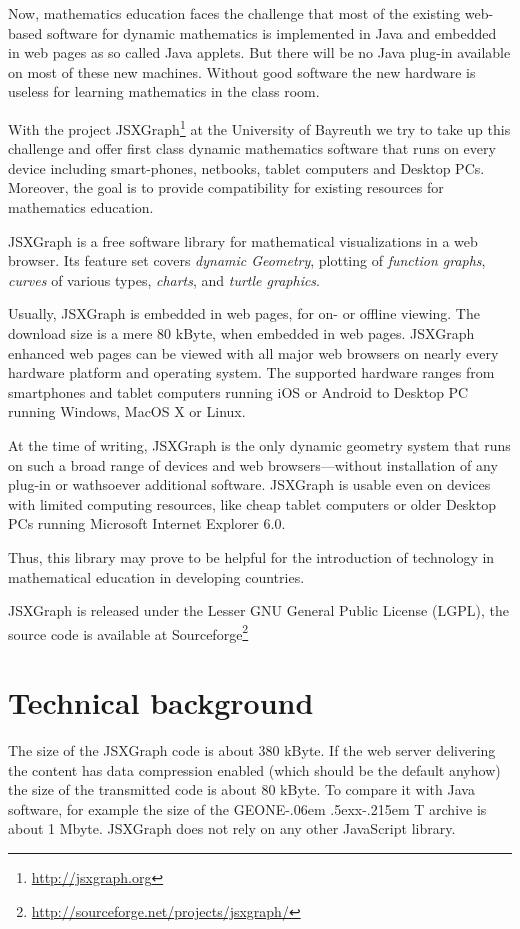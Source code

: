 \documentclass[12pt,a4paper]{article}%
\def\GEONExT{GEONE\kern-.06em \lower.5ex\hbox{x}\kern-.215em T}
\begin{document}
Now, mathematics education faces the challenge that most of the existing web-based software 
for dynamic mathematics is implemented in Java and embedded in web pages as so called Java applets.  
But there will be no Java plug-in available on most of these new machines. 
Without good software the new hardware is useless for learning mathematics 
in the class room.

With the project JSXGraph\footnote{\href{http://jsxgraph.org}{http://jsxgraph.org}} 
at the University of Bayreuth we try to take up 
this challenge and offer first class dynamic mathematics software that runs on 
every device including smart-phones, netbooks, tablet computers and Desktop PCs. 
Moreover, the goal is to provide compatibility for existing resources for 
mathematics education. 

JSXGraph is a free software library for mathematical visualizations in a web browser.
Its feature set covers {\sl dynamic Geometry}, plotting of {\sl function graphs}, 
{\sl curves} of various types, {\sl charts}, and {\sl turtle graphics}.

Usually, JSXGraph is embedded in web pages, for on- or off\/line viewing.
The download size is a mere 80 kByte, when embedded in web pages.
JSXGraph enhanced web pages can be viewed with all major web browsers 
on nearly every hardware platform and operating system.
The supported hardware ranges from smartphones and tablet computers 
running iOS or Android  to Desktop PC running Windows, MacOS X or Linux.

At the time of writing, JSXGraph is the only dynamic geometry system that runs  
on such a broad range of  devices and web browsers---without installation of any plug-in 
or wathsoever additional software.
JSXGraph is usable even on devices with limited computing resources, like cheap tablet computers or
older Desktop PCs running Microsoft Internet Explorer 6.0. 

Thus, this library may prove to be helpful for the
introduction of technology in mathematical education in developing countries.

JSXGraph 
is released under the Lesser GNU General Public License (LGPL), the source code
is available at Sourceforge\footnote{\href{http://sourceforge.net/projects/jsxgraph/}{http://sourceforge.net/projects/jsxgraph/}}


\section{Technical background}
The  size 
of the JSXGraph code is about 380 kByte. If the web server delivering the 
content has data compression enabled (which should be the default anyhow) the 
size of the transmitted code is about 80 kByte. To compare it with Java software, 
for example the size of the \GEONExT{} archive is about 1 Mbyte. JSXGraph does not 
rely on any other JavaScript library.
\end{document}
